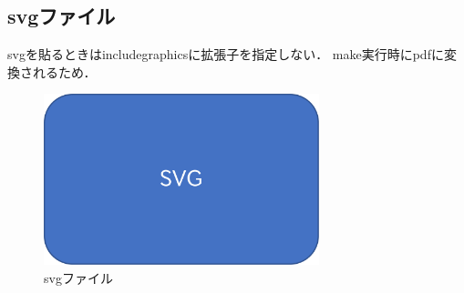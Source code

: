 \documentclass[submit,techreq,noauthor]{eco}	%
\begin{document}
\subsection{svgファイル}
svgを貼るときはincludegraphicsに拡張子を指定しない．
make実行時にpdfに変換されるため．
\begin{figure}[t]
	\centering\includegraphics[width=80mm, angle=0]{fig/svg-sample}
	\caption{svgファイル}\label{fig:svg-sample}
\end{figure}




\setlength\baselineskip{12pt}
{\small
	
	
}
\end{document}
